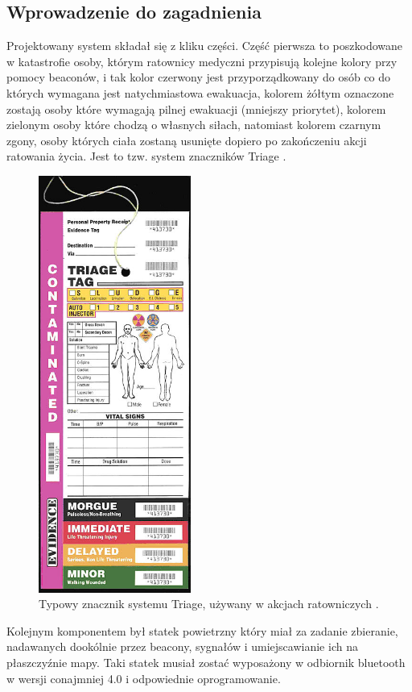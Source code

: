 \subsection{Wprowadzenie do zagadnienia}
Projektowany system składał się z kliku części. Część pierwsza to poszkodowane w katastrofie osoby, którym ratownicy medyczni przypisują kolejne kolory przy pomocy beaconów, i tak kolor czerwony jest przyporządkowany do osób co do których wymagana jest natychmiastowa ewakuacja, kolorem żółtym oznaczone zostają osoby które wymagają pilnej ewakuacji (mniejszy priorytet), kolorem zielonym osoby które chodzą o własnych siłach, natomiast kolorem czarnym zgony, osoby których ciała zostaną usunięte dopiero po zakończeniu akcji ratowania życia. Jest to tzw. system znaczników Triage \cite{triage}.

\begin{figure}[!th]
    \centering
    \includegraphics[width=5cm]{zalaczniki/obrazy/triage_tag.jpg}
    \caption{Typowy znacznik systemu Triage, używany w akcjach ratowniczych \cite{triage}.}
    \label{fig:triage}
\end{figure}

Kolejnym komponentem był statek powietrzny który miał za zadanie zbieranie, nadawanych dookólnie przez beacony, sygnałów i umiejscawianie ich na płaszczyźnie mapy. Taki statek musiał zostać wyposażony w odbiornik bluetooth w wersji conajmniej 4.0 i odpowiednie oprogramowanie.

